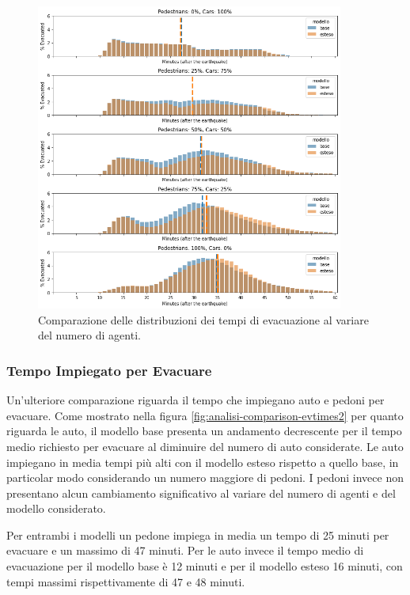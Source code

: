 \begin{figure}[ht]
    \centering
    \includegraphics[width=0.9\textwidth]{images/analisi/comparison-evtimes.png}
    \caption{Comparazione delle distribuzioni dei tempi di evacuazione al variare del numero di agenti.}
    \label{fig:analisi-comparison-evtimes}
\end{figure}

\pagebreak

\subsubsection*{Tempo Impiegato per Evacuare}
Un'ulteriore comparazione riguarda il tempo che impiegano auto e pedoni per evacuare.
Come mostrato nella figura \ref{fig:analisi-comparison-evtimes2} per quanto riguarda le auto, 
il modello base presenta un andamento decrescente per il tempo medio richiesto per evacuare al diminuire del numero di auto considerate.
Le auto impiegano in media tempi più alti con il modello esteso rispetto a quello base, in particolar modo considerando un numero maggiore di pedoni.
%
I pedoni invece non presentano alcun cambiamento significativo al variare del numero di agenti e del modello considerato.

Per entrambi i modelli un pedone impiega in media un tempo di 25 minuti per evacuare e un massimo di 47 minuti.
Per le auto invece il tempo medio di evacuazione per il modello base è 12 minuti e per il modello esteso 16 minuti,
con tempi massimi rispettivamente di 47 e 48 minuti.

